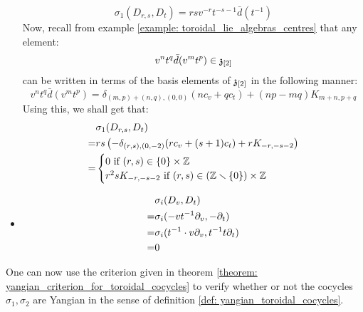 \begin{example}
\begin{itemize}
                    $$\sigma_1(D_{r, s}, D_t) = rs v^{-r} t^{-s - 1} \bar{d}(t^{-1})$$
                Now, recall from example \ref{example: toroidal_lie_algebras_centres} that any element:
                    $$v^n t^q \bar{d}(v^m t^p) \in \mathfrak{z}_{[2]}$$
                can be written in terms of the basis elements of $\mathfrak{z}_{[2]}$ in the following manner:
                    $$v^n t^q \bar{d}(v^m t^p) = \delta_{(m, p) + (n, q), (0, 0)} ( n c_v + q c_t ) + (np - mq) K_{m + n, p + q}$$
                Using this, we shall get that:
                    $$
                        \begin{aligned}
                            & \sigma_1(D_{r, s}, D_t)
                            \\
                            = & rs \left( -\delta_{(r, s), (0, -2)} ( r c_v + (s + 1) c_t ) + r K_{-r, -s - 2} \right)
                            \\
                            = & 
                            \begin{cases}
                                \text{$0$ if $(r, s) \in \{0\} \x \Z$}
                                \\
                                \text{$r^2s K_{-r, -s - 2}$ if $(r, s) \in (\Z \setminus \{0\}) \x \Z$}
                            \end{cases}
                        \end{aligned}
                    $$
                \item
                    $$
                        \begin{aligned}
                            & \sigma_i(D_v, D_t)
                            \\
                            = & \sigma_i(-v t^{-1} \partial_v, -\partial_t)
                            \\
                            = & \sigma_i(t^{-1} \cdot v \partial_v, t^{-1} t \partial_t)
                            \\
                            = & 0
                        \end{aligned}
                    $$
            \end{itemize}

            One can now use the criterion given in theorem \ref{theorem: yangian_criterion_for_toroidal_cocycles} to verify whether or not the cocycles $\sigma_1, \sigma_2$ are Yangian in the sense of definition \ref{def: yangian_toroidal_cocycles}.
        \end{example}
